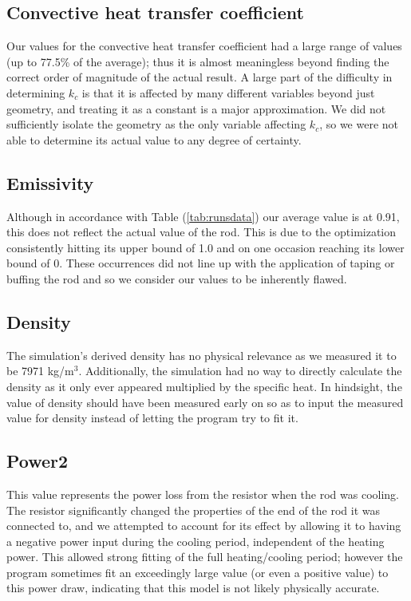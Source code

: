 \documentclass[letterpaper,titlepage,oneside]{report}
\begin{document}
\subsection* {Convective heat transfer coefficient}
Our values for the convective heat transfer coefficient had a
large range of values (up to 77.5\% of the average); thus it is
almost meaningless beyond finding the correct order of
magnitude of the actual result.
A large part of the difficulty in determining $k_c$ is that it is
affected by many different variables beyond just geometry,
and treating it as a constant is a major approximation.
We did not sufficiently isolate the geometry as the only variable
affecting $k_c$, so we were not able to determine its actual value
to any degree of certainty.

\subsection* {Emissivity}
Although in accordance with Table (\ref{tab:runsdata}) our average
value is at 0.91, this does not reflect the
actual value of the rod. This is due to the optimization
consistently hitting its upper bound of 1.0 and on one
occasion reaching its lower bound of 0.
These occurrences did not line up with the application of taping
or buffing the rod and so we consider our values to be inherently
flawed.

\subsection* {Density}
The simulation's derived density has no physical relevance as we
measured it to be 7971 kg/m$^3$. Additionally, the simulation had
no way to directly calculate the density as it only ever
appeared multiplied by the specific heat.
In hindsight, the value of density should have been measured early on
so as to input the measured value for density instead of
letting the program try to fit it.

\subsection* {Power2}
This value represents the power loss from the resistor when the rod
was cooling. The resistor significantly changed the properties
of the end of the rod it was connected to, and we attempted to
account for its effect by allowing it to having a negative power
input during the cooling period, independent of the heating power.
This allowed strong fitting of the full heating/cooling period;
however the program sometimes fit an exceedingly large value
(or even a positive value) to this power draw,
indicating that this model is not likely physically accurate.
\end{document}
